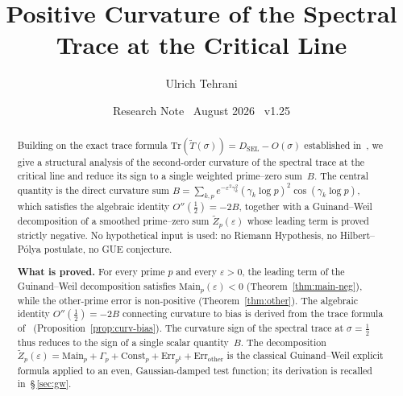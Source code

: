\documentclass[11pt]{article}
\title{\vspace{-1.5em}\bfseries Positive Curvature of the Spectral Trace
at the Critical Line}
\author{Ulrich Tehrani}
\date{Research Note \textperiodcentered\ August 2026
      \textperiodcentered\ v1.25}
\newcommand{\Tt}{\widetilde{T}}
\newcommand{\DSEL}{D_{\mathrm{SEL}}}
\begin{document}
\maketitle

\begin{abstract}
Building on the exact trace formula $\mathrm{Tr}(\Tt(\sigma))=\DSEL-O(\sigma)$
established in~\cite{Paper5}, we give a structural analysis of the
second-order curvature of the spectral trace at the critical line
and reduce its sign to a single weighted prime--zero sum~$B$.
The central quantity is the direct curvature sum
$B=\sum_{k,p} e^{-\varepsilon^2\gamma_k^2}(\gamma_k\log p)^2\cos(\gamma_k\log p)$,
which satisfies the algebraic identity $O''(\tfrac12)=-2B$, together with a
Guinand--Weil decomposition of a smoothed prime--zero sum $\widetilde Z_p(\varepsilon)$
whose leading term is proved strictly negative.
No hypothetical input is used: no Riemann Hypothesis, no Hilbert--P\'olya
postulate, no GUE conjecture.

\textbf{What is proved.}
For every prime $p$ and every $\varepsilon>0$, the leading term of the
Guinand--Weil decomposition satisfies
$\mathrm{Main}_p(\varepsilon)<0$ (Theorem~\ref{thm:main-neg}), while the
other-prime error is non-positive (Theorem~\ref{thm:other}).
The algebraic identity $O''(\tfrac12)=-2B$ connecting curvature to bias
is derived from the trace formula of~\cite{Paper5}
(Proposition~\ref{prop:curv-bias}).
The curvature sign of the spectral trace at $\sigma=\tfrac12$
thus reduces to the sign of a single scalar quantity~$B$.
The decomposition
$\widetilde Z_p(\varepsilon)=\mathrm{Main}_p+\Gamma_p+\mathrm{Const}_p
+\mathrm{Err}_{p^k}+\mathrm{Err}_{\mathrm{other}}$
is the classical Guinand--Weil explicit formula applied to an even,
Gaussian-damped test function; its derivation is recalled in~\S\,\ref{sec:gw}.


\end{abstract}
\end{document}
